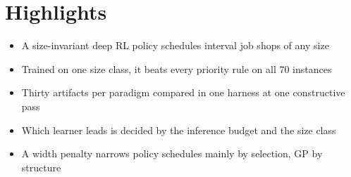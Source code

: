 \documentclass[12pt]{article}
\begin{document}
\section*{Highlights}
\begin{itemize}
\item A size-invariant deep RL policy schedules interval job shops of any size
\item Trained on one size class, it beats every priority rule on all 70 instances
\item Thirty artifacts per paradigm compared in one harness at one constructive pass
\item Which learner leads is decided by the inference budget and the size class
\item A width penalty narrows policy schedules mainly by selection, GP by structure
\end{itemize}
\end{document}
